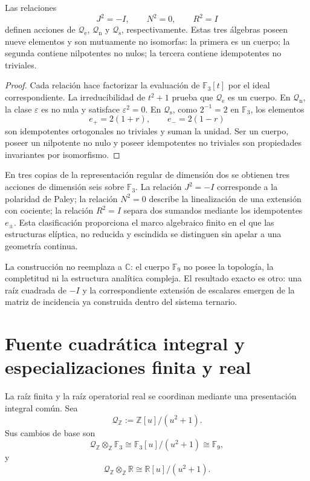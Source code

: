 \begin{theorem}
\label{thm:clasificacion-cuadratica-nonadica}
Las relaciones
\[
 J^2=-I,\qquad N^2=0,\qquad R^2=I
\]
definen acciones de
\(\mathcal Q_{\mathrm e}\), \(\mathcal Q_{\mathrm n}\) y
\(\mathcal Q_{\mathrm s}\), respectivamente. Estas tres álgebras poseen
nueve elementos y son mutuamente no isomorfas: la primera es un cuerpo; la
segunda contiene nilpotentes no nulos; la tercera contiene idempotentes no
triviales.
\end{theorem}

\begin{proof}
Cada relación hace factorizar la evaluación de
\(\mathbb F_3[t]\) por el ideal correspondiente. La irreducibilidad de
\(t^2+1\) prueba que \(\mathcal Q_{\mathrm e}\) es un cuerpo. En
\(\mathcal Q_{\mathrm n}\), la clase \(\varepsilon\) es no nula y satisface
\(\varepsilon^2=0\). En \(\mathcal Q_{\mathrm s}\), como \(2^{-1}=2\) en
\(\mathbb F_3\), los elementos
\[
 e_+=2(1+r),\qquad e_-=2(1-r)
\]
son idempotentes ortogonales no triviales y suman la unidad. Ser un cuerpo,
poseer un nilpotente no nulo y poseer idempotentes no triviales son
propiedades invariantes por isomorfismo.
\end{proof}

En tres copias de la representación regular de dimensión dos se obtienen
tres acciones de dimensión seis sobre \(\mathbb F_3\). La relación
\(J^2=-I\) corresponde a la polaridad de Paley; la relación \(N^2=0\)
describe la linealización de una extensión con cociente; la relación
\(R^2=I\) separa dos sumandos mediante los idempotentes \(e_\pm\). Esta
clasificación proporciona el marco algebraico finito en el que las
estructuras elíptica, no reducida y escindida se distinguen sin apelar a una
geometría continua.

La construcción no reemplaza a \(\mathbb C\): el cuerpo \(\mathbb F_9\) no
posee la topología, la completitud ni la estructura analítica compleja. El
resultado exacto es otro: una raíz cuadrada de \(-I\) y la correspondiente
extensión de escalares emergen de la matriz de incidencia ya construida
dentro del sistema ternario.

\section{Fuente cuadrática integral y especializaciones finita y real}
\label{sec:fuente-cuadratica-integral-rev3}

La raíz finita y la raíz operatorial real se coordinan mediante una
presentación integral común. Sea
\begin{equation}
 \mathcal Q_{\mathbb Z}
 :=\mathbb Z[u]/(u^2+1).
 \label{eq:fuente-cuadratica-integral-rev3}
\end{equation}
Sus cambios de base son
\[
 \mathcal Q_{\mathbb Z}\otimes_{\mathbb Z}\mathbb F_3
 \cong\mathbb F_3[u]/(u^2+1)
 \cong\mathbb F_9,
\]
y
\[
 \mathcal Q_{\mathbb Z}\otimes_{\mathbb Z}\mathbb R
 \cong\mathbb R[u]/(u^2+1).
\]


